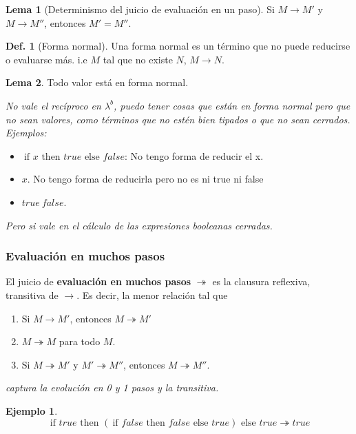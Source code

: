 \documentclass{report}
\theoremstyle{definition} %
\newtheorem{lemma}{Lema}[chapter]
\newtheorem{definition}{Def.}[chapter]
\newtheorem*{example*}{Ejemplo}
\newcommand{\lambdab}{\lambda^b}
\newcommand{\ifte}[3]{\ \text{if } #1 \text{ then } #2 \text{ else } #3}
\newcommand{\app}[2]{#1 \ #2} %
\newcommand{\reduces}{\to}
\newcommand{\reduce}[2]{#1 \reduces #2}
\newcommand{\reduceManyTo}{\twoheadrightarrow}
\newcommand{\reduceMany}[2]{#1 \reduceManyTo #2}
\begin{document}
\begin{lemma}[Determinismo del juicio de evaluación en un paso]
    Si $\reduce{M}{M'}$ y $\reduce{M}{M''}$, entonces $M' = M''$.
\end{lemma}

\begin{definition}[Forma normal]
    Una forma normal es un término que no puede reducirse o evaluarse más. i.e
    $M$ tal que no existe $N$, $\reduce{M}{N}$.
\end{definition}
\begin{lemma}
    Todo valor está en forma normal.

    \textit{No vale el recíproco en $\lambdab$, puedo tener cosas que están en forma normal pero que no sean valores, como términos que no estén bien tipados o que no sean cerrados. Ejemplos:}
    
    \begin{itemize}
        \item $\ifte{x}{true}{false}$: No tengo forma de reducir el x.
        \item $x$. No tengo forma de reducirla pero no es ni true ni false
        \item $\app{true}{false}$.
    \end{itemize}
    
    \textit{Pero si vale en el cálculo de las expresiones booleanas cerradas.}
\end{lemma}

\subsubsection{Evaluación en muchos pasos}

El juicio de \textbf{evaluación en muchos pasos} $\reduceManyTo$ es la
clausura reflexiva, transitiva de $\to$. Es decir, la menor relación tal que

\begin{enumerate}
    \item Si $\reduce{M}{M'}$, entonces $\reduceMany{M}{M'}$
    \item $\reduceMany{M}{M}$ para todo $M$.
    \item Si $\reduceMany{M}{M'}$ y $\reduceMany{M'}{M''}$, entonces $\reduceMany{M}{M''}$.
\end{enumerate}

\textit{captura la evolución en 0 y 1 pasos y la transitiva.}

\begin{example*}
    \[
    \reduceMany
        {\ifte{true}{(\ifte{false}{false}{true})}{true}}
        {true}
    \]
\end{example*}
\end{document}
